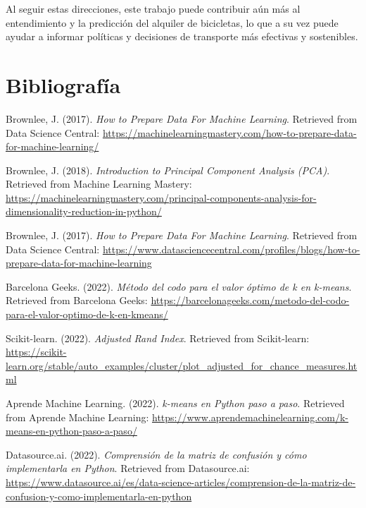 \documentclass{wsdcr}
\begin{document}
Al seguir estas direcciones, este trabajo puede contribuir aún más al entendimiento y la predicción del alquiler de bicicletas, lo que a su vez puede ayudar a informar políticas y decisiones de transporte más efectivas y sostenibles.



\section*{Bibliografía}

\begin{thebibliography}{9}

    Brownlee, J. (2017).
    \textit{How to Prepare Data For Machine Learning}.
    Retrieved from Data Science Central: \url{https://machinelearningmastery.com/how-to-prepare-data-for-machine-learning/}

    Brownlee, J. (2018).
    \textit{Introduction to Principal Component Analysis (PCA)}.
    Retrieved from Machine Learning Mastery: \url{https://machinelearningmastery.com/principal-components-analysis-for-dimensionality-reduction-in-python/}

    Brownlee, J. (2017).
    \textit{How to Prepare Data For Machine Learning}.
    Retrieved from Data Science Central: \url{https://www.datasciencecentral.com/profiles/blogs/how-to-prepare-data-for-machine-learning}

    Barcelona Geeks. (2022).
    \textit{Método del codo para el valor óptimo de k en k-means}.
    Retrieved from Barcelona Geeks: \url{https://barcelonageeks.com/metodo-del-codo-para-el-valor-optimo-de-k-en-kmeans/}

    Scikit-learn. (2022).
    \textit{Adjusted Rand Index}.
    Retrieved from Scikit-learn: \url{https://scikit-learn.org/stable/auto_examples/cluster/plot_adjusted_for_chance_measures.html}

    Aprende Machine Learning. (2022).
    \textit{k-means en Python paso a paso}.
    Retrieved from Aprende Machine Learning: \url{https://www.aprendemachinelearning.com/k-means-en-python-paso-a-paso/}

    Datasource.ai. (2022).
    \textit{Comprensión de la matriz de confusión y cómo implementarla en Python}.
    Retrieved from Datasource.ai: \url{https://www.datasource.ai/es/data-science-articles/comprension-de-la-matriz-de-confusion-y-como-implementarla-en-python}


\end{thebibliography}
\end{document}

